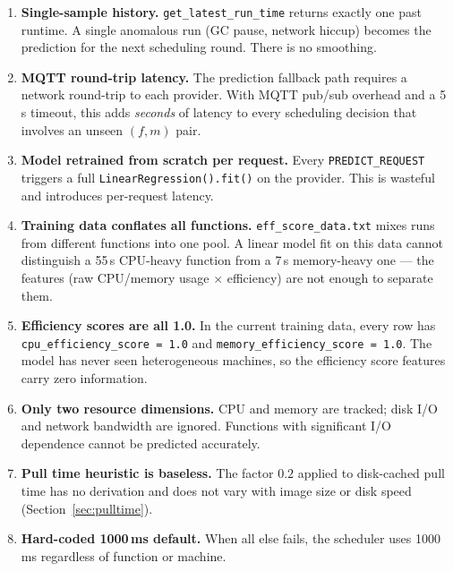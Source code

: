 \documentclass[11pt, a4paper]{article}
\newcommand{\bluecontentend}{\endgroup}
\begin{document}
\begin{enumerate}[label=(\arabic*)]
    \item \textbf{Single-sample history.}
          \texttt{get\_latest\_run\_time} returns exactly one past runtime.
          A single anomalous run (GC pause, network hiccup) becomes the
          prediction for the next scheduling round. There is no smoothing.

    \item \textbf{MQTT round-trip latency.}
          The prediction fallback path requires a network round-trip to
          each provider. With MQTT pub/sub overhead and a 5\,s timeout,
          this adds \emph{seconds} of latency to every scheduling
          decision that involves an unseen $(f, m)$ pair.

    \item \textbf{Model retrained from scratch per request.}
          Every \texttt{PREDICT\_REQUEST} triggers a full
          \texttt{LinearRegression().fit()} on the provider. This is
          wasteful and introduces per-request latency.

    \item \textbf{Training data conflates all functions.}
          \texttt{eff\_score\_data.txt} mixes runs from different
          functions into one pool. A linear model fit on this data
          cannot distinguish a 55\,s CPU-heavy function from a 7\,s
          memory-heavy one --- the features (raw CPU/memory usage
          $\times$ efficiency) are not enough to separate them.

    \item \textbf{Efficiency scores are all 1.0.}
          In the current training data, every row has
          \texttt{cpu\_efficiency\_score = 1.0} and
          \texttt{memory\_efficiency\_score = 1.0}. The model has
          never seen heterogeneous machines, so the efficiency score
          features carry zero information.

    \item \textbf{Only two resource dimensions.}
          CPU and memory are tracked; disk I/O and network bandwidth
          are ignored. Functions with significant I/O dependence
          cannot be predicted accurately.

    \item \textbf{Pull time heuristic is baseless.}
          The factor $0.2$ applied to disk-cached pull time has no
          derivation and does not vary with image size or disk speed
          (Section~\ref{sec:pulltime}).

    \item \textbf{Hard-coded 1000\,ms default.}
          When all else fails, the scheduler uses 1000\,ms regardless
          of function or machine.
\end{enumerate}
\bluecontentend
\end{document}

